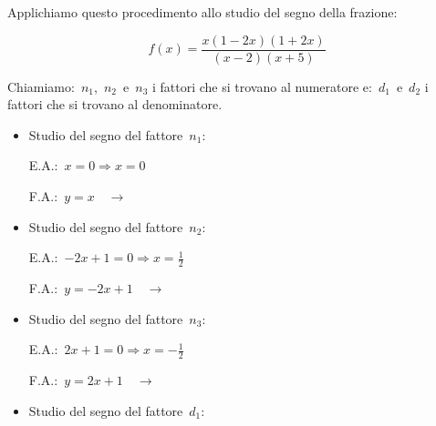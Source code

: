 \begin{esempio}{}{}
Applichiamo questo procedimento allo studio del segno della frazione:

\[f(x)=\frac{x(1 -2 x)(1 + 2 x)}{(x -2)(x +5)}\]

Chiamiamo:~\(n_1\),~\(n_2\)~e~\(n_3\) i fattori che si trovano al numeratore 
e:~\(d_1\)~e~\(d_2\) i fattori che si trovano al denominatore.

\begin{itemize} [noitemsep]
 \item Studio del segno del fattore~\(n_1\):\\
 \begin{minipage}{.45\textwidth}
  E.A.:~\(x=0 \Rightarrow x=0\)
 \end{minipage}
 \begin{minipage}{.25\textwidth}
  F.A.:~\(y = x \quad \rightarrow\)
 \end{minipage}
 \begin{minipage}{.3\textwidth}
%   
 \end{minipage}
 \item Studio del segno del fattore~\(n_2\):\\
 \begin{minipage}{.45\textwidth}
  E.A.:~\(-2 x +1=0 \Rightarrow x=\frac{1}{2}\)
 \end{minipage}
 \begin{minipage}{.25\textwidth}
  F.A.:~\(y = -2 x +1 \quad \rightarrow\)
 \end{minipage}
 \begin{minipage}{.3\textwidth}
%   
 \end{minipage}
 \item Studio del segno del fattore~\(n_3\):\\
 \begin{minipage}{.45\textwidth}
  E.A.:~\(2 x +1=0 \Rightarrow x=- \frac{1}{2}\)
 \end{minipage}
 \begin{minipage}{.25\textwidth}
  F.A.:~\(y=2 x +1 \quad \rightarrow\)
 \end{minipage}
 \begin{minipage}{.3\textwidth}
%   
 \end{minipage}
 \item Studio del segno del fattore~\(d_1\):\\

\end{itemize}
\end{esempio}
